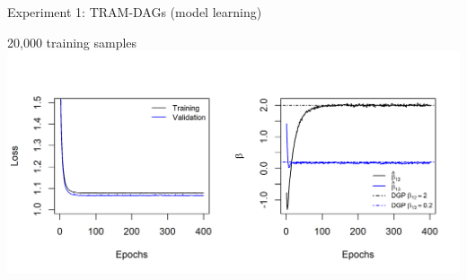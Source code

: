 \documentclass[onlytextwidth,english]{beamer}\usepackage[]{graphicx}\usepackage[]{xcolor}
\begin{document}
\begin{frame}{Experiment 1: TRAM-DAGs (model learning)}


20,000 training samples
{
\centering
  \includegraphics[width=1\linewidth]{img/experiment1/exp1_loss_parameters.png}
}
  


\end{frame}
\end{document}
